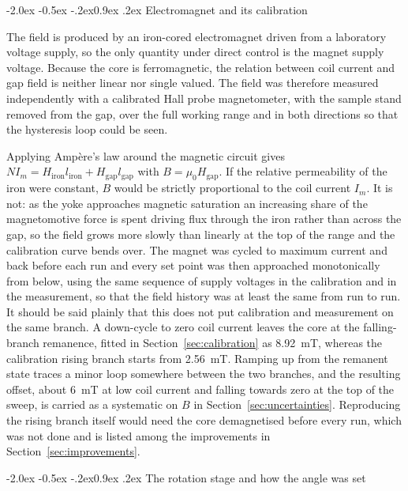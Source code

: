 \documentclass[11pt,a4paper]{article}
\makeatletter
\renewcommand\subsection{\@startsection{subsection}{2}{\z@}%
  {-2.0ex \@plus -0.5ex \@minus -.2ex}{0.9ex \@plus .2ex}%
  {\normalfont\normalsize\bfseries}}
\makeatother
\begin{document}
\subsection{Electromagnet and its calibration}

The field is produced by an iron-cored electromagnet driven from a laboratory voltage
supply, so the only quantity under direct control is the magnet supply voltage. Because the
core is ferromagnetic, the relation between coil current and gap field is neither linear nor
single valued. The field was therefore measured independently with a calibrated Hall probe
magnetometer, with the sample stand removed from the gap, over the full working range and in
both directions so that the hysteresis loop could be seen.

Applying Amp\`ere's law around the magnetic circuit gives
$NI_m = H_{\mathrm{iron}}l_{\mathrm{iron}} + H_{\mathrm{gap}}l_{\mathrm{gap}}$ with
$B = \mu_0 H_{\mathrm{gap}}$. If the relative permeability of the iron were constant, $B$
would be strictly proportional to the coil current $I_m$. It is not: as the yoke approaches
magnetic saturation an increasing share of the magnetomotive force is spent driving flux
through the iron rather than across the gap, so the field grows more slowly than linearly at
the top of the range and the calibration curve bends over. The magnet was cycled to maximum
current and back before each run and every set point was then approached monotonically from
below, using the same sequence of supply voltages in the calibration and in the measurement,
so that the field history was at least the same from run to run. It should be said plainly
that this does not put calibration and measurement on the same branch. A down-cycle to zero
coil current leaves the core at the falling-branch remanence, fitted in
Section~\ref{sec:calibration} as \qty{8.92}{\milli\tesla}, whereas the calibration rising
branch starts from \qty{2.56}{\milli\tesla}. Ramping up from the remanent state traces a
minor loop somewhere between the two branches, and the resulting offset, about
\qty{6}{\milli\tesla} at low coil current and falling towards zero at the top of the sweep,
is carried as a systematic on $B$ in Section~\ref{sec:uncertainties}. Reproducing the rising
branch itself would need the core demagnetised before every run, which was not done and is
listed among the improvements in Section~\ref{sec:improvements}.

\subsection{The rotation stage and how the angle was set}
\label{sec:stage}
\end{document}
